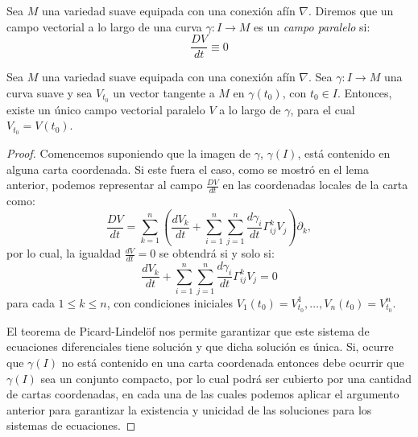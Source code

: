 \begin{definition}
	Sea $M$ una variedad suave equipada con una conexión afín $\nabla$. Diremos que un campo vectorial a lo largo de una curva $\gamma: I \to M$ es un \textit{campo paralelo} si:
	\[
		\frac{DV}{dt} \equiv 0
	\]
\end{definition}

\begin{theorem}\label{Teorema: Existencia y Unicidad de Campos Paralelos}
	Sea $M$ una variedad suave equipada con una conexión afín $\nabla$. Sea $\gamma: I \to M$ una curva suave y sea $V_{t_{0}}$ un vector tangente a $M$ en $\gamma(t_{0})$, con $t_{0} \in I$. Entonces, existe un único campo vectorial paralelo $V$ a lo largo de $\gamma$, para el cual $V_{t_{0}} = V(t_{0})$.
\end{theorem}

\begin{proof}
	Comencemos suponiendo que la imagen de $\gamma$, $\gamma(I)$, está contenido en alguna carta coordenada. Si este fuera el caso, como se mostró en el lema anterior, podemos representar al campo $\frac{DV}{dt}$ en las coordenadas locales de la carta como:
	\[
		\frac{DV}{dt} = \sum_{k=1}^{n} \left(\frac{dV_{k}}{dt}
		+ \sum_{i=1}^{n}\sum_{j=1}^{n} \frac{d\gamma_{i}}{dt} \Gamma_{ij}^{k} V_{j}\right) \partial_{k},
	\]
	por lo cual, la igualdad $\frac{dV}{dt} = 0$ se obtendrá si y solo si:
	\[
		\frac{d V_{k}}{dt} + \sum_{i=1}^{n}\sum_{j=1}^{n} \frac{d\gamma_{i}}{dt} \Gamma_{ij}^{k} V_{j} = 0
	\]
	para cada $1 \leq k \leq n$, con condiciones iniciales $V_{1}(t_{0}) = V^{1}_{t_{0}}, \ldots, V_{n}(t_{0}) = V^{n}_{t_0}$.

	El teorema de Picard-Lindelöf nos permite garantizar que este sistema de ecuaciones diferenciales tiene solución y que dicha solución es única. Si, ocurre que $\gamma(I)$ no está contenido en una carta coordenada entonces debe ocurrir que $\gamma(I)$ sea un conjunto compacto, por lo cual podrá ser cubierto por una cantidad de cartas coordenadas, en cada una de las cuales podemos aplicar el argumento anterior para garantizar la existencia y unicidad de las soluciones para los sistemas de ecuaciones.
\end{proof}
